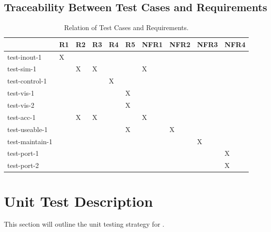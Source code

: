\documentclass[12pt, titlepage]{article}
\begin{document}
\subsection{Traceability Between Test Cases and Requirements}

\begin{table}[!h]
  \centering
  \caption{Relation of Test Cases and Requirements.}
  \label{tab:traceability}
  \begin{tabular}{|l|l|l|l|l|l|l|l|l|l|}
    \hline
                    & R1 & R2 & R3 & R4 & R5 & NFR1 & NFR2 & NFR3 & NFR4 \\ \hline
    test-inout-1    & X  &    &    &    &    &      &      &      &      \\ \hline
    test-sim-1      &    & X  & X  &    &    & X    &      &      &      \\ \hline
    test-control-1  &    &    &    & X  &    &      &      &      &      \\ \hline
    test-vis-1      &    &    &    &    & X  &      &      &      &      \\ \hline
    test-vis-2      &    &    &    &    & X  &      &      &      &      \\ \hline
    test-acc-1      &    & X  & X  &    &    & X    &      &      &      \\ \hline
    test-useable-1  &    &    &    &    & X  &      & X    &      &      \\ \hline
    test-maintain-1 &    &    &    &    &    &      &      & X    &      \\ \hline
    test-port-1     &    &    &    &    &    &      &      &      & X    \\ \hline
    test-port-2     &    &    &    &    &    &      &      &      & X    \\ \hline
  \end{tabular}
\end{table}


\section{Unit Test Description} \label{unit_test}

This section will outline the unit testing strategy for \progname{}.

\end{document}
